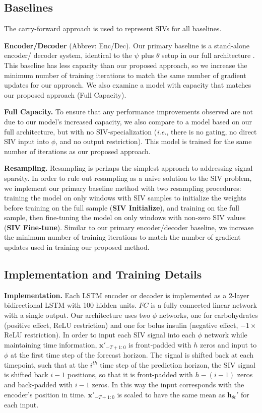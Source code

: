 \documentclass[letterpaper]{article}
\begin{document}
\subsection{Baselines}

The carry-forward approach is used to represent SIVs for all baselines.

\textbf{Encoder/Decoder} (Abbrev: Enc/Dec). Our primary baseline is a stand-alone encoder/ decoder system, identical to the $\psi$ plus $\theta$ setup in our full architecture \cite{iankdd}. This baseline has less capacity than our proposed approach, so we increase the minimum number of training iterations to match the same number of gradient updates for our approach. We also examine a model with capacity that matches our proposed approach (Full Capacity).

\textbf{Full Capacity.} To ensure that any performance improvements observed are not due to our model's increased capacity, we also compare  to a model based on our full architecture, but with no SIV-specialization (\textit{i.e.}, there is no gating,  no direct SIV input into $\phi$, and no output restriction). This model is trained for the same number of iterations as our proposed approach.

\textbf{Resampling.} Resampling is perhaps the simplest approach to addressing signal sparsity. In order to rule out resampling as a naive solution to the SIV problem, we implement our primary baseline method with two resampling procedures: training the model on only windows with SIV samples to initialize the weights before training on the full sample (\textbf{SIV Initialize}), and training on the full sample, then fine-tuning the model on only windows with non-zero SIV values (\textbf{SIV Fine-tune}).  Similar to our primary encoder/decoder baseline, we increase the minimum number of training iterations to match the number of gradient updates used in training our proposed method.



\subsection{Implementation and Training Details}

\textbf{Implementation.} Each LSTM encoder or decoder is implemented as a 2-layer bidirectional LSTM with 100 hidden units. $FC$ is a fully connected linear network with a single output. Our architecture uses two $\phi$ networks, one for carbohydrates (positive effect, ReLU restriction) and one for bolus insulin (negative effect, $-1 \times $ ReLU restriction).  In order to input each SIV signal into each $\phi$ network while maintaining time information, $\mathbf{x}'_{-T+1:0}$ is front-padded with $h$ zeros and input to $\phi$ at the first time step of the forecast horizon. The signal is shifted back at each timepoint, such that at the $i^{th}$ time step of the prediction horizon, the SIV signal is shifted back $i-1$ positions, so that it is front-padded with $h-(i-1)$ zeros and back-padded with $i-1$ zeros. In this way the input corresponds with the encoder's position in time. $\mathbf{x}'_{-T+1:0}$ is scaled to have the same mean as $\mathbf{h}_{{\theta}t}'$ for each input.
\end{document}
